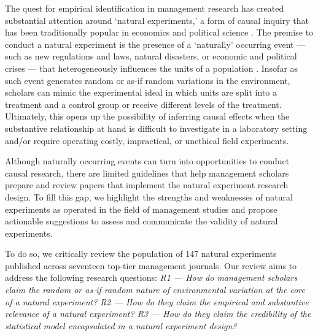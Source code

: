 
The quest for empirical identification in management research has created
substantial attention around `natural experiments,' a form of causal inquiry
that has been traditionally popular in economics
\parencite[][]{Meyer1995,Rosenzweig2000} and political science
\parencite[][]{Dunning2008}.  The premise to conduct a natural experiment is the
presence of a `naturally' occurring event --- such as new regulations and laws,
natural disasters, or economic and political crises --- that heterogeneously
influences the units of a population \parencite[][]{dunning2012,Robinson2009}.
Insofar as such event generates random or as-if random variations in the
environment, scholars can mimic the experimental ideal in which units are split
into a treatment and a control group or receive different levels of the
treatment. Ultimately, this opens up the possibility of inferring causal effects
when the substantive relationship at hand is difficult to investigate in a
laboratory setting and/or require operating costly, impractical, or unethical
field experiments.


Although naturally occurring events can turn into opportunities to conduct
causal research, there are limited guidelines that help management scholars
prepare and review papers that implement the natural experiment research design.
To fill this gap, we highlight the strengths and weaknesses of natural
experiments as operated in the field of management studies and propose
actionable suggestions to assess and communicate the validity of natural
experiments.

To do so, we critically review the population of 147 natural experiments
published across seventeen top-tier management journals. Our review aims
to address the following research questions: \emph{R1 --- How do management
scholars claim the random or as-if random nature of environmental variation at
the core of a natural experiment? R2 --- How do they claim the empirical and
substantive relevance of a natural experiment? R3 --- How do they claim the
credibility of the statistical model encapsulated in a natural experiment
design?}

